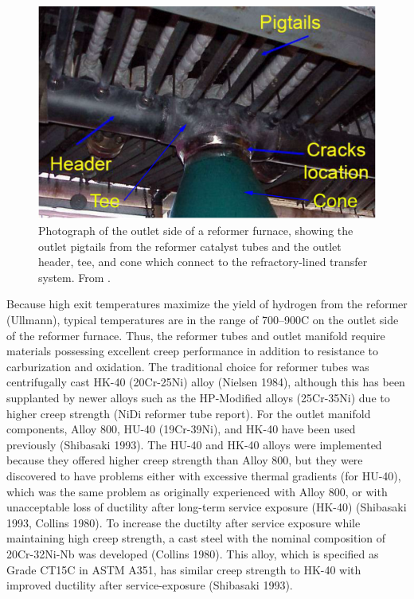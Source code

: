 \begin{figure}[h]
\centering
\includegraphics{figures/reformer-tee-cone}
\caption{Photograph of the outlet side of a reformer furnace, showing the outlet pigtails from the reformer catalyst tubes and the outlet header, tee, and cone which connect to the refractory-lined transfer system.  From \citet{penso_repair_2006}.}
\label{fig:reformer-tee-cone}
\end{figure}

Because high exit temperatures maximize the yield of hydrogen from the reformer (Ullmann), typical temperatures are in the range of 700--900C on the outlet side of the reformer furnace. Thus, the reformer tubes and outlet manifold require materials possessing excellent creep performance in addition to resistance to carburization and oxidation. The traditional choice for reformer tubes was centrifugally cast HK-40 (20Cr-25Ni) alloy  (Nielsen 1984), although this has been supplanted by newer alloys such as the HP-Modified alloys (25Cr-35Ni) due to higher creep strength (NiDi reformer tube report). For the outlet manifold components, Alloy 800, HU-40 (19Cr-39Ni), and HK-40 have been used previously (Shibasaki 1993). The HU-40 and HK-40 alloys were implemented because they offered higher creep strength than Alloy 800, but they were discovered to have problems either with excessive thermal gradients (for HU-40), which was the same problem as originally experienced with Alloy 800, or with unacceptable loss of ductility after long-term service exposure (HK-40) (Shibasaki 1993, Collins 1980). To increase the ductilty after service exposure while maintaining high creep strength, a cast steel with the nominal composition of 20Cr-32Ni-Nb was developed (Collins 1980). This alloy, which is specified as Grade CT15C in ASTM A351, has similar creep strength to HK-40 with improved ductility after service-exposure (Shibasaki 1993). 

